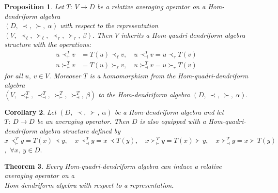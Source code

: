 \documentclass[11pt,twoside,reqno]{amsart}
\theoremstyle{plain}
\newtheorem{thm}{Theorem}[section]
\newtheorem{proposition}[thm]{Proposition}
\newtheorem{cor}[thm]{Corollary}
\theoremstyle{definition}
\begin{document}
\begin{proposition}\label{prop3.11}
Let  $T : \ V \to D$ be a relative averaging operator on a Hom-dendriform algebra \\$(D ,\ \prec,\  \succ ,\ \alpha)$ with respect to the representation $(V ,\  \prec_{\ell} ,\ \succ_{\ell},\  \prec_{r}  ,\ \succ_{r} ,\ \beta)$. Then $V$ inherits a Hom-quadri-dendriform algebra structure with the operations:
\begin{align*}
u \prec^{T}_{\vdash} v &= T(u) \prec_{\ell} v ,\quad u\prec^{T}_{\dashv} v = u \prec_{r} T(v) \\
u\succ^{T}_{\vdash} v &= T(u) \succ_{\ell} v ,\quad u \succ^{T}_{\dashv} v = u \succ_{r} T(v) 
\end{align*}
for all $u ,\ v \in V$.  Moreover  $T$  is  a  homomorphism from  the Hom-quadri-dendriform  algebra \\$(V ,\ \prec^{T}_{\vdash} ,\ \prec^{T}_{\dashv},\  \succ^{T}_{\vdash},\  \succ^{T}_{\dashv},\  \beta)$ to  the  Hom-dendriform algebra $(D ,\  \prec  ,\ \succ ,\ \alpha).$
\end{proposition}
\begin{cor}
Let $(D ,\ \prec,\  \succ ,\ \alpha)$ be a Hom-dendriform algebra and let $ T :\ D \to D $ be an  averaging operator. Then  $D$ is also equipped with a Hom-quadri-dendriform algebra structure defined by\\
$x \prec^{T}_\vdash y = T(x) \prec y ,\quad x \prec^{T}_\dashv y = x \prec T(y) ,\quad x \succ^{T}_\vdash y = T(x) \succ y  ,\quad x \succ^{T}_\dashv y = x \succ T(y)$ ,\
 $\forall x,\ y \in D.$
\end{cor}
\begin{thm}
 Every Hom-quadri-dendriform algebra can  induce a relative  averaging  operator on  a\\  Hom-dendriform algebra with respect to a representation.
\end{thm}
\end{document}
